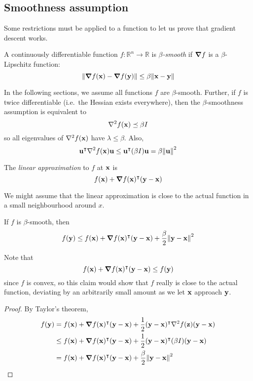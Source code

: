 \subsection{Smoothness assumption}
Some restrictions must be applied to a function to let us prove that gradient descent works.
\begin{definition}
	A continuously differentiable function \(f \colon \mathbb R^n \to \mathbb R\) is \textit{\(\beta\)-smooth} if \(\grad{f}\) is a \(\beta\)-Lipschitz function:
	\[
		\norm{\grad{f(\vb x) - \grad{f(\vb y)}}} \leq \beta \norm{\vb x - \vb y}
	\]
\end{definition}
In the following sections, we assume all functions \(f\) are \(\beta\)-smooth.
Further, if \(f\) is twice differentiable (i.e.\ the Hessian exists everywhere), then the \(\beta\)-smoothness assumption is equivalent to
\[
	\laplacian{f(\vb x)} \preceq \beta I
\]
so all eigenvalues of \(\laplacian{f(\vb x)}\) have \(\lambda \leq \beta\).
Also,
\[
	\vb u^\transpose \laplacian{f(\vb x)} \vb u \leq \vb u^\transpose (\beta I) \vb u = \beta \norm{\vb u}^2
\]
\begin{definition}
	The \textit{linear approximation} to \(f\) at \(\vb x\) is
	\[
		f(\vb x) + \grad{f(\vb x)}^\intercal (\vb y - \vb x)
	\]
\end{definition}
We might assume that the linear approximation is close to the actual function in a small neighbourhood around \(x\).
\begin{claim}
	If \(f\) is \(\beta\)-smooth, then
	\[
		f(\vb y) \leq f(\vb x) + \grad{f(\vb x)}^\intercal (\vb y - \vb x) + \frac{\beta}{2}\norm{\vb y - \vb x}^2
	\]
\end{claim}
Note that
\[
	f(\vb x) + \grad{f(\vb x)}^\intercal (\vb y - \vb x) \leq f(\vb y)
\]
since \(f\) is convex, so this claim would show that \(f\) really is close to the actual function, deviating by an arbitrarily small amount as we let \(\vb x\) approach \(\vb y\).
\begin{proof}
	By Taylor's theorem,
	\begin{align*}
		f(\vb y) & = f(\vb x) + \grad{f(\vb x)}^\transpose (\vb y - \vb x) + \frac{1}{2}(\vb y - \vb x)^\transpose \laplacian{f(\vb z)}(\vb y - \vb x) \\
		         & \leq f(\vb x) + \grad{f(\vb x)}^\transpose (\vb y - \vb x) + \frac{1}{2}(\vb y - \vb x)^\transpose (\beta I) (\vb y - \vb x)        \\
		         & = f(\vb x) + \grad{f(\vb x)}^\transpose (\vb y - \vb x) + \frac{\beta}{2}\norm{\vb y - \vb x}^2                                     \\
	\end{align*}
\end{proof}

